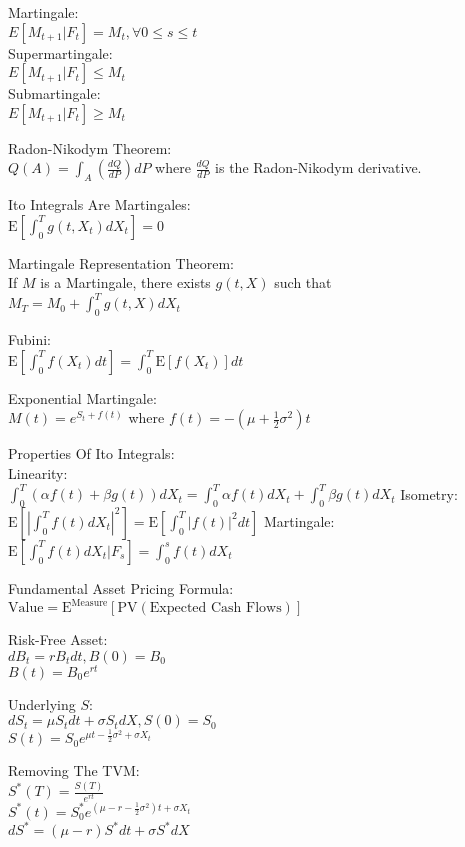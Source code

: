 Martingale: \\
$E[M_{t+1}|F_t]=M_t, \forall 0\le s\le t$ \\
Supermartingale: \\
$E[M_{t+1}|F_t]\le M_t$ \\
Submartingale: \\
$E[M_{t+1}|F_t]\ge M_t$

Radon-Nikodym Theorem: \\
$Q(A)=\int_A \left(\frac{dQ}{dP} \right) dP$ where $\frac{dQ}{dP}$ is the Radon-Nikodym derivative.

Ito Integrals Are Martingales: \\
$\text{E}\left[\int_0^T g(t,X_t)dX_t \right]=0$

Martingale Representation Theorem: \\
If $M$ is a Martingale, there exists $g(t,X)$ such that \\
$M_T=M_0+\int_0^T g(t,X)dX_t$

Fubini: \\
$\text{E}\left[\int_0^T f(X_t) dt \right]=\int_0^T \text{E}[f(X_t)]dt$

Exponential Martingale: \\
$M(t)=e^{S_t+f(t)}$ where $f(t)=-(\mu + \frac{1}{2} \sigma^2)t$

Properties Of Ito Integrals: \\
Linearity: \\
$\int_0^T (\alpha f(t)+\beta g(t)) dX_t=\int_0^T \alpha f(t) dX_t + \int_0^T \beta g(t) dX_t$
Isometry: \\
$\text{E}\left[ | \int_0^T f(t) dX_t |^2 \right]=\text{E}\left[\int_0^T |f(t)|^2 dt \right]$
Martingale: \\
$\text{E}\left[\int_0^T f(t) dX_t | F_s \right]=\int_0^s f(t) dX_t$

Fundamental Asset Pricing Formula: \\
$\text{Value}=\text{E}^{\text{Measure}}[\text{PV}(\text{Expected Cash Flows})]$

Risk-Free Asset: \\
$dB_t=r B_t dt,B(0)=B_0$ \\
$B(t)=B_0 e^{rt}$

Underlying $S$: \\
$dS_t=\mu S_t dt+\sigma S_t dX, S(0)=S_0$ \\
$S(t)=S_0 e^{\mu t-\frac{1}{2} \sigma^2 + \sigma X_t}$

Removing The TVM: \\
$S^* (T) = \frac{S(T)}{e^{rt}}$ \\
$S^* (t) = S_0^* e^{(\mu-r-\frac{1}{2}\sigma^2)t+\sigma X_t}$ \\
$dS^* = (\mu-r)S^* dt+\sigma S^* dX$

